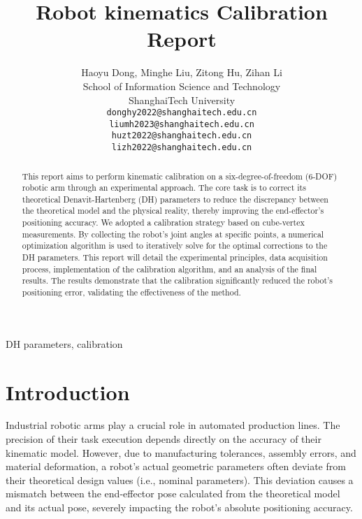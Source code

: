 \documentclass[conference]{IEEEtran}
\begin{document}
\title{Robot kinematics Calibration Report\\

}

\author{Haoyu Dong, Minghe Liu, Zitong Hu, Zihan Li\\
	School of Information Science and Technology\\
	ShanghaiTech University\\
	\texttt{donghy2022@shanghaitech.edu.cn} \\
        \texttt{liumh2023@shanghaitech.edu.cn} \\
	\texttt{huzt2022@shanghaitech.edu.cn} \\
        \texttt{lizh2022@shanghaitech.edu.cn} \\
        
}

\maketitle

\begin{abstract}
This report aims to perform kinematic calibration on a six-degree-of-freedom (6-DOF) robotic arm through an experimental approach. The core task is to correct its theoretical Denavit-Hartenberg (DH) parameters to reduce the discrepancy between the theoretical model and the physical reality, thereby improving the end-effector's positioning accuracy. We adopted a calibration strategy based on cube-vertex measurements. By collecting the robot's joint angles at specific points, a numerical optimization algorithm is used to iteratively solve for the optimal corrections to the DH parameters. This report will detail the experimental principles, data acquisition process, implementation of the calibration algorithm, and an analysis of the final results. The results demonstrate that the calibration significantly reduced the robot's positioning error, validating the effectiveness of the method.
\end{abstract}

\begin{IEEEkeywords}
 DH parameters, calibration
\end{IEEEkeywords}

\section{Introduction}
Industrial robotic arms play a crucial role in automated production lines. The precision of their task execution depends directly on the accuracy of their kinematic model. However, due to manufacturing tolerances, assembly errors, and material deformation, a robot's actual geometric parameters often deviate from their theoretical design values (i.e., nominal parameters). This deviation causes a mismatch between the end-effector pose calculated from the theoretical model and its actual pose, severely impacting the robot's absolute positioning accuracy.
\end{document}

